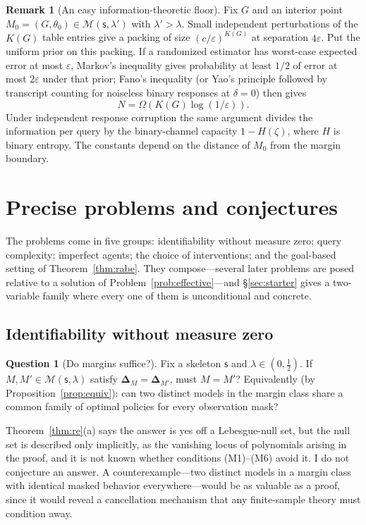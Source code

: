 \documentclass[11pt]{amsart}
\theoremstyle{plain}
\theoremstyle{definition}
\newtheorem{question}[theorem]{Question}
\newtheorem{remark}[theorem]{Remark}
\newcommand{\MM}{\mathcal{M}}
\newcommand{\sk}{\mathsf{s}}
\begin{document}
\begin{remark}[An easy information-theoretic floor]\label{rem:packing}
Fix $G$ and an interior point $M_0=(G,\theta_0)\in\MM(\sk,\lambda')$ with $\lambda'>\lambda$. Small independent perturbations of the $K(G)$ table entries give a packing of size $(c/\varepsilon)^{K(G)}$ at separation $4\varepsilon$. Put the uniform prior on this packing. If a randomized estimator has worst-case expected error at most $\varepsilon$, Markov's inequality gives probability at least $1/2$ of error at most $2\varepsilon$ under that prior; Fano's inequality (or Yao's principle followed by transcript counting for noiseless binary responses at $\delta=0$) then gives
\[
   N=\Omega\!\left(K(G)\log(1/\varepsilon)\right).
\]
Under independent response corruption the same argument divides the information per query by the binary-channel capacity $1-H(\zeta)$, where $H$ is binary entropy. The constants depend on the distance of $M_0$ from the margin boundary.
\end{remark}

\section{Precise problems and conjectures}\label{sec:problems}

The problems come in five groups: identifiability without measure zero; query complexity; imperfect agents; the choice of interventions; and the goal-based setting of Theorem~\ref{thm:rabe}. They compose---several later problems are posed relative to a solution of Problem~\ref{prob:effective}---and \S\ref{sec:starter} gives a two-variable family where every one of them is unconditional and concrete.

\subsection{Identifiability without measure zero}

\begin{question}[Do margins suffice?]\label{q:ident}
Fix a skeleton $\sk$ and $\lambda\in(0,\tfrac12)$. If $M,M'\in\MM(\sk,\lambda)$ satisfy $\boldsymbol\Delta_M=\boldsymbol\Delta_{M'}$, must $M=M'$? Equivalently (by Proposition~\ref{prop:equiv}): can two distinct models in the margin class share a common family of optimal policies for every observation mask?
\end{question}

Theorem~\ref{thm:re}(a) says the answer is yes off a Lebesgue-null set, but the null set is described only implicitly, as the vanishing locus of polynomials arising in the proof, and it is not known whether conditions (M1)--(M6) avoid it. I do not conjecture an answer. A counterexample---two distinct models in a margin class with identical masked behavior everywhere---would be as valuable as a proof, since it would reveal a cancellation mechanism that any finite-sample theory must condition away.
\end{document}
